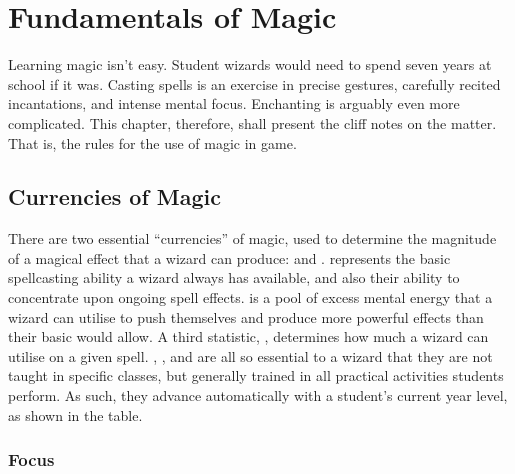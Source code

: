\chapter{Fundamentals of Magic}

Learning magic isn't easy.
Student wizards would need to spend seven years at school if it was.
Casting spells is an exercise in precise gestures, carefully recited incantations, and intense mental focus.
Enchanting is arguably even more complicated.
This chapter, therefore, shall present the cliff notes on the matter. %
That is, the rules for the use of magic in game.

\section{Currencies of Magic}

There are two essential ``currencies'' of magic, used to determine the magnitude of a magical effect that a wizard can produce: {\focus} and {\mana}.
\capital{\focus} represents the basic spellcasting ability a wizard always has available, and also their ability to concentrate upon ongoing spell effects.
\capital{\mana} is a pool of excess mental energy that a wizard can utilise to push themselves and produce more powerful effects than their basic {\focus} would allow.
A third statistic, {\overchannel}, determines how much {\mana} a wizard can utilise on a given spell.
\capital{\focus}, {\mana}, and {\overchannel} are all so essential to a wizard that they are not taught in specific classes, but generally trained in all practical activities students perform.
As such, they advance automatically with a student's current year level, as shown in the  table.


\subsection{Focus}

